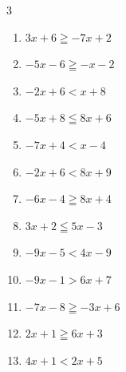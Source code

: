 \begin{multicols}{3}
\begin{enumerate}

  \item $3x+6\geqq -7x+2$


  \item $-5x-6\geqq -x-2$

        \phantom{$\displaystyle x\leqq -1$}

\columnbreak %

  \item $-2x+6<x+8$


  \item $-5x+8\leqq 8x+6$


  \item $-7x+4<x-4$

        \phantom{$\displaystyle x>1$}

  \item $-2x+6<8x+9$


  \item $-6x-4\geqq 8x+4$


  \item $3x+2\leqq 5x-3$


  \item $-9x-5<4x-9$


  \item $-9x-1>6x+7$


  \item $-7x-8\geqq -3x+6$


  \item $2x+1\geqq 6x+3$


  \item $4x+1<2x+5$


\end{enumerate}
\end{multicols}
